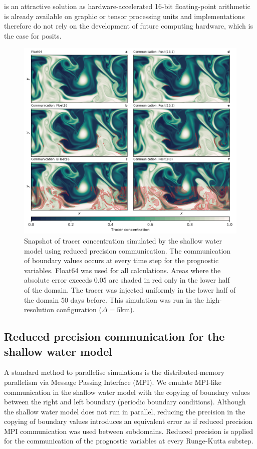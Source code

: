 \documentclass[draft]{agujournal2019}
\begin{document}
 is an attractive solution as hardware-accelerated 16-bit
floating-point arithmetic is already available on graphic or tensor processing
units and implementations therefore do not rely on the development of future
computing hardware, which is the case for posits.

\begin{figure}
\includegraphics[width=1\textwidth]{snapshot_comm.png}
\caption{Snapshot of tracer concentration simulated by the shallow water model
using reduced precision communication. The communication of boundary values occurs
at every time step for the prognostic variables. Float64 was used for all calculations.
Areas where the absolute error exceeds 0.05 are shaded in red only in the lower
half of the domain. The tracer was injected uniformly in the lower half of the
domain 50 days before. This simulation was run in the high-resolution
configuration ($\Delta = 5$km).}
\label{fig:snapshot_comm}
\end{figure}


\subsection{Reduced precision communication for the shallow water model}
\label{sec:comm}

A standard method to parallelise simulations is the distributed-memory parallelism
via Message Passing Interface (MPI). We emulate MPI-like communication in the
shallow water model with the copying of boundary values between the right and
left boundary (periodic boundary conditions). Although the shallow water model
does not run in parallel, reducing the precision in the copying of boundary values
introduces an equivalent error as if reduced precision MPI communication was used
between subdomains. Reduced precision is applied for the communication of the
prognostic variables at every Runge-Kutta substep.
\end{document}
